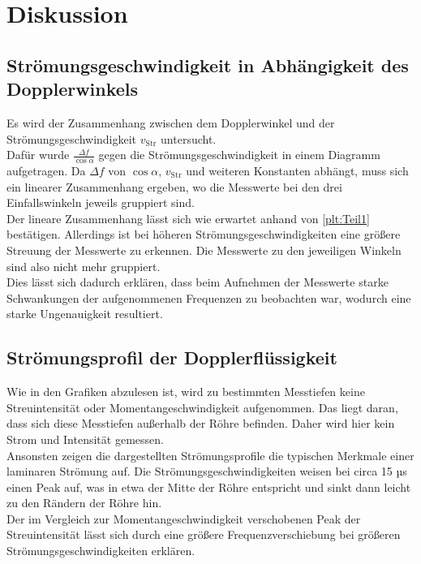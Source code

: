 \section{Diskussion}
\label{sec:Diskussion}

\subsection{Strömungsgeschwindigkeit in Abhängigkeit des Dopplerwinkels}

Es wird der Zusammenhang zwischen dem Dopplerwinkel und der Strömungsgeschwindigkeit $v_{\mathrm{Str}}$
untersucht.\\
Dafür wurde $\frac{\Delta f}{\cos{\alpha}}$ gegen die Strömungsgeschwindigkeit in einem Diagramm
aufgetragen. Da $\Delta f$ von $\cos{\alpha}$, $v_{\mathrm{Str}}$ und weiteren Konstanten abhängt,
muss sich ein linearer Zusammenhang ergeben, wo die Messwerte bei den drei Einfallswinkeln jeweils
gruppiert sind.\\
Der lineare Zusammenhang lässt sich wie erwartet anhand von \autoref{plt:Teil1} bestätigen. Allerdings
ist bei höheren Strömungsgeschwindigkeiten eine größere Streuung der Messwerte zu erkennen. Die Messwerte
zu den jeweiligen Winkeln sind also nicht mehr gruppiert.\\
Dies lässt sich dadurch erklären, dass beim Aufnehmen der Messwerte starke Schwankungen der aufgenommenen 
Frequenzen zu beobachten war, wodurch eine starke Ungenauigkeit resultiert.\\

\subsection{Strömungsprofil der Dopplerflüssigkeit}

Wie in den Grafiken abzulesen ist, wird zu bestimmten Messtiefen keine Streuintensität oder
Momentangeschwindigkeit aufgenommen. Das liegt daran, dass sich diese Messtiefen außerhalb der Röhre
befinden. Daher wird hier kein Strom und Intensität gemessen.\\
Ansonsten zeigen die dargestellten Strömungsprofile die typischen Merkmale einer laminaren Strömung 
auf. Die Strömungsgeschwindigkeiten weisen bei circa 15 µs einen Peak auf, was in etwa der Mitte der
Röhre entspricht und sinkt dann leicht zu den Rändern der Röhre hin.\\
Der im Vergleich zur Momentangeschwindigkeit verschobenen Peak der Streuintensität lässt sich durch
eine größere Frequenzverschiebung bei größeren Strömungsgeschwindigkeiten erklären.\\

\label{Anhang}
